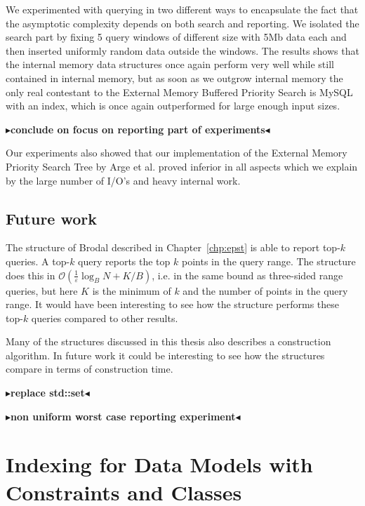 \documentclass[twoside,11pt,openright]{report}
\def \epsilon {\varepsilon}
\newcommand{\todo}[1]{{\color[rgb]{.5,0,0}\textbf{$\blacktriangleright$#1$\blacktriangleleft$}}}
\begin{document}
We experimented with querying in two different ways to encapsulate the fact that the asymptotic complexity depends on both search and reporting. We isolated the search part by fixing 5 query windows of different size with 5Mb data each and then inserted uniformly random data outside the windows. The results shows that the internal memory data structures once again perform very well while still contained in internal memory, but as soon as we outgrow internal memory the only real contestant to the External Memory Buffered Priority Search is MySQL with an index, which is once again outperformed for large enough input sizes.

\todo{conclude on focus on reporting part of experiments}

Our experiments also showed that our implementation of the External Memory Priority Search Tree by Arge et al. proved inferior in all aspects which we explain by the large number of I/O's and heavy internal work.

\section{Future work}
The structure of Brodal described in Chapter~\ref{chp:epst} is able to report top-$k$ queries. A top-$k$ query reports the top $k$ points in the query range. The structure does this in $\mathcal{O}(\frac{1}{\epsilon}\log_B N + K/B)$, i.e. in the same bound as three-sided range queries, but here $K$ is the minimum of $k$ and the number of points in the query range. It would have been interesting to see how the structure performs these top-$k$ queries compared to other results.

Many of the structures discussed in this thesis also describes a construction algorithm. In future work it could be interesting to see how the structures compare in terms of construction time.

\todo{replace std::set}

\todo{non uniform worst case reporting experiment}

\clearpage
{}


\clearpage

\appendix

\chapter{Indexing for Data Models with Constraints and Classes}
\label{chp:kanellakis}
\end{document}
